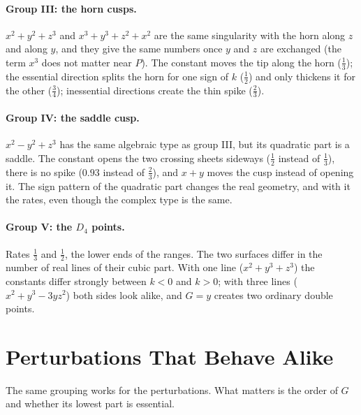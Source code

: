 \documentclass[12pt, a4paper]{article}
\theoremstyle{plain}
\theoremstyle{definition}
\theoremstyle{remark}
\theoremstyle{definition}
\begin{document}
\paragraph{Group III: the horn cusps.} $x^2+y^2+z^3$ and $x^3+y^3+z^2+x^2$ are the
same singularity with the horn along $z$ and along $y$, and they give the same
numbers once $y$ and $z$ are exchanged (the term $x^3$ does not matter near $P$).
The constant moves the tip along the horn ($\tfrac13$); the essential direction
splits the horn for one sign of $k$ ($\tfrac12$) and only thickens it for the other
($\tfrac34$); inessential directions create the thin spike ($\tfrac23$).

\paragraph{Group IV: the saddle cusp.} $x^2-y^2+z^3$ has the same algebraic type as
group III, but its quadratic part is a saddle. The constant opens the two crossing
sheets sideways ($\tfrac12$ instead of $\tfrac13$), there is no spike ($0.93$
instead of $\tfrac23$), and $x+y$ moves the cusp instead of opening it. The sign
pattern of the quadratic part changes the real geometry, and with it the rates,
even though the complex type is the same.

\paragraph{Group V: the $D_4$ points.} Rates $\tfrac13$ and $\tfrac12$, the lower
ends of the ranges. The two surfaces differ in the number of real lines of their
cubic part. With one line ($x^2+y^3+z^3$) the constants differ strongly between
$k<0$ and $k>0$; with three lines ($x^2+y^3-3yz^2$) both sides look alike, and
$G=y$ creates two ordinary double points.

\section{Perturbations That Behave Alike}
\label{sec:r-groupG}

The same grouping works for the perturbations. What matters is the order of $G$
and whether its lowest part is essential.
\end{document}
